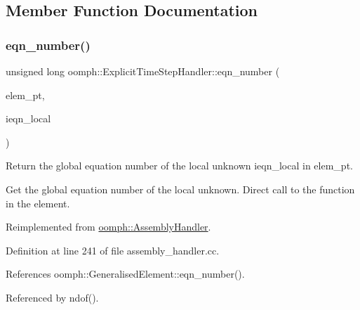 \subsection{Member Function Documentation}
\mbox{\label{classoomph_1_1ExplicitTimeStepHandler_a491d39988264739332c3e9c7dbb38344}} 
\subsubsection{\texorpdfstring{eqn\+\_\+number()}{eqn\_number()}}
{\footnotesize\ttfamily unsigned long oomph\+::\+Explicit\+Time\+Step\+Handler\+::eqn\+\_\+number (\begin{DoxyParamCaption}\item[{\hyperlink{classoomph_1_1GeneralisedElement}{Generalised\+Element} $\ast$const \&}]{elem\+\_\+pt,  }\item[{const unsigned \&}]{ieqn\+\_\+local }\end{DoxyParamCaption})\hspace{0.3cm}{\ttfamily [virtual]}}



Return the global equation number of the local unknown ieqn\+\_\+local in elem\+\_\+pt. 

Get the global equation number of the local unknown. Direct call to the function in the element. 

Reimplemented from \hyperlink{classoomph_1_1AssemblyHandler_a94d28e2de2559cde803d1ba2195b5290}{oomph\+::\+Assembly\+Handler}.



Definition at line 241 of file assembly\+\_\+handler.\+cc.



References oomph\+::\+Generalised\+Element\+::eqn\+\_\+number().



Referenced by ndof().

\mbox{\label{classoomph_1_1ExplicitTimeStepHandler_a842529121fbe177ea6900d668d8b2a65}} 

